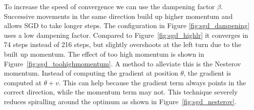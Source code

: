 \documentclass[12pt]{article}
\begin{document}
To increase the speed of convergence we can use the dampening factor $\beta$. Successive movements in the same direction build up higher momentum and allows SGD to take longer steps. The configuration in Figure \ref{fig:sgd_dampening} uses a low dampening factor. Compared to Figure~\ref{fig:sgd_highlr} it converges in 74 steps instead of 216 steps, but slightly overshoots at the left turn due to the built up momentum. The effect of too high momentum is shown in Figure~\ref{fig:sgd_toohighmomentum}. A method to alleviate this is the Nesterov momentum. Instead of computing the gradient at position $\theta$, the gradient is computed at $\theta + v$. This can help because the gradient term always points in the correct direction, while the momentum term may not. This technique severely reduces spiralling around the optimum as shown in Figure~\ref{fig:sgd_nesterov}.

\end{document}
